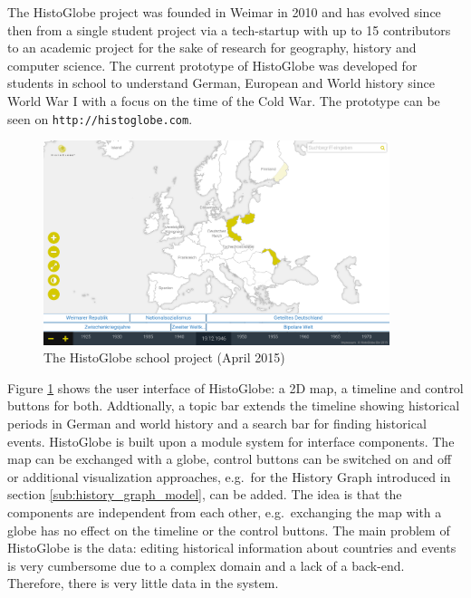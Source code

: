 The HistoGlobe project was founded in Weimar in 2010 and has evolved since then from a single student project via a tech-startup with up to 15 contributors to an academic project for the sake of research for geography, history and computer science. The current prototype of HistoGlobe was developed for students in school to understand German, European and World history since World War I with a focus on the time of the Cold War. The prototype can be seen on \texttt{http://histoglobe.com}.

\begin{figure}[ht]
  \vspace{1em}
  \centering
  \includegraphics[width=0.9\textwidth]{graphics/basics/histoglobe/school_project}
  \caption{The HistoGlobe school project (April 2015)}
  \label{fig:histoglobe_school}
\end{figure}

Figure \ref{fig:histoglobe_school} shows the user interface of HistoGlobe: a 2D map, a timeline and control buttons for both. Addtionally, a topic bar extends the timeline showing historical periods in German and world history and a search bar for finding historical events. HistoGlobe is built upon a module system for interface components. The map can be exchanged with a globe, control buttons can be switched on and off or additional visualization approaches, e.g.\ for the History Graph introduced in section \ref{sub:history_graph_model}, can be added. The idea is that the components are independent from each other, e.g.\ exchanging the map with a globe has no effect on the timeline or the control buttons. The main problem of HistoGlobe is the data: editing historical information about countries and events is very cumbersome due to a complex domain and a lack of a back-end. Therefore, there is very little data in the system.


